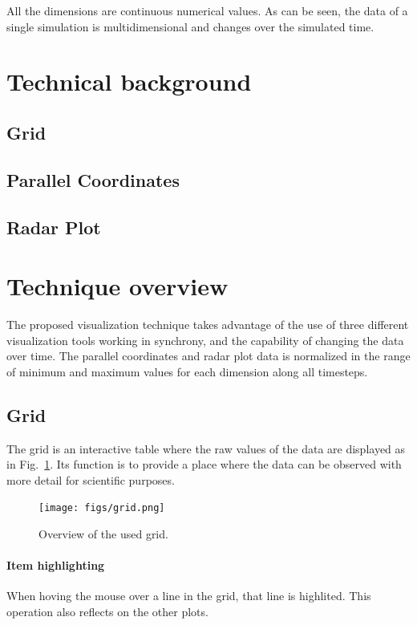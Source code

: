 \documentclass[10pt, conference]{IEEEtran}
\begin{document}
All the dimensions are continuous numerical values. As can be seen, the data of a single simulation is multidimensional and changes over the simulated time.

\section{Technical background}
%

\subsection{Grid}

\subsection{Parallel Coordinates}

\subsection{Radar Plot}

\section{Technique overview}
%

The proposed visualization technique takes advantage of the use of three different visualization tools working in synchrony, and the capability of changing the data over time. The parallel coordinates and radar plot data is normalized in the range of minimum and maximum values for each dimension along all timesteps.

\subsection{Grid}

The grid is an interactive table where the raw values of the data are displayed as in Fig.~\ref{fig:grid}. Its function is to provide a place where the data can be observed with more detail for scientific purposes.

\begin{figure}
\texttt{[image: figs/grid.png]}
\caption{Overview of the used grid.} 
\label{fig:grid}
\end{figure}
\paragraph*{Item highlighting} When hoving the mouse over a line in the grid, that line is highlited. This operation also reflects on the other plots.
\end{document}
